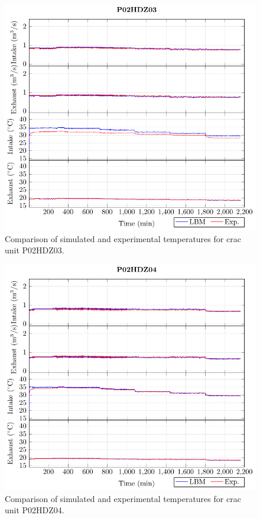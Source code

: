 \clearpage

\begin{figure}[!htb]
\centering
\includegraphics[width=\linewidth]{Plots/P02HDZ03_T.pdf}
\caption{Comparison of simulated and experimental temperatures for \gls{crac} unit P02HDZ03.}
\label{fig:P02HDZ03_plot}
\end{figure}

\clearpage

\begin{figure}[!htb]
\centering
\includegraphics[width=\linewidth]{Plots/P02HDZ04_T.pdf}
\caption{Comparison of simulated and experimental temperatures for \gls{crac} unit P02HDZ04.}
\label{fig:P02HDZ04_plot}
\end{figure}


